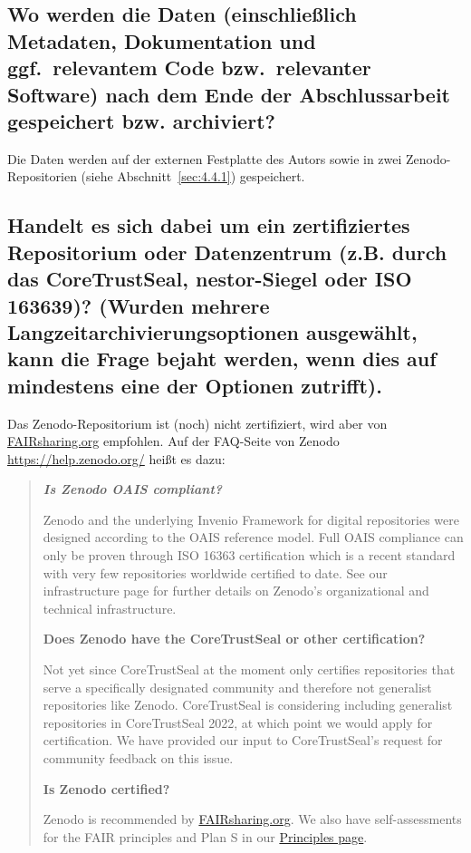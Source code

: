 \documentclass[%
  11pt,
  DIV=16,
  a4paper,
  BCOR=15mm,
  twoside=on,
  bibliography=totoc,
  headings=normal,
  numbers=noendperiod,
]{scrartcl}
\begin{document}
\subsection{Wo werden die Daten (einschließlich Metadaten, Dokumentation und ggf.\ relevantem Code bzw.\ relevanter Software) nach dem Ende der Abschlussarbeit gespeichert bzw. archiviert?}

Die Daten werden auf der externen Festplatte des Autors
sowie in zwei Zenodo-Repositorien (siehe Abschnitt~\ref{sec:4.4.1}) gespeichert.

\subsection{Handelt es sich dabei um ein zertifiziertes Repositorium oder Datenzentrum (z.B. durch das CoreTrustSeal, nestor-Siegel oder ISO 163639)? (Wurden mehrere Langzeitarchivierungsoptionen ausgewählt, kann die Frage bejaht werden, wenn dies auf mindestens eine der Optionen zutrifft).}

Das Zenodo-Repositorium ist (noch) nicht zertifiziert, wird aber von \href{https://fairsharing.org/}{FAIRsharing.org} empfohlen.
Auf der FAQ-Seite von Zenodo \url{https://help.zenodo.org/} heißt es dazu:

\begin{quote}
  \itshape
  \textbf{\textsf{Is Zenodo OAIS compliant?}}
  
  Zenodo and the underlying Invenio Framework for digital repositories were designed according to the OAIS reference model. Full OAIS compliance can only be proven through ISO 16363 certification which is a recent standard with very few repositories worldwide certified to date. See our infrastructure page for further details on Zenodo’s organizational and technical infrastructure.
  
  \textbf{\textsf{Does Zenodo have the CoreTrustSeal or other certification?}}
  
  Not yet since CoreTrustSeal at the moment only certifies repositories that serve a specifically designated community and therefore not generalist repositories like Zenodo. CoreTrustSeal is considering including generalist repositories in CoreTrustSeal 2022, at which point we would apply for certification. We have provided our input to CoreTrustSeal’s request for community feedback on this issue.
  
  \textbf{\textsf{Is Zenodo certified?}}
  
  Zenodo is recommended by \href{https://fairsharing.org/}{FAIRsharing.org}. We also have self-assessments for the FAIR principles and Plan S in our \href{https://about.zenodo.org/principles/}{Principles page}.
\end{quote}
\end{document}
